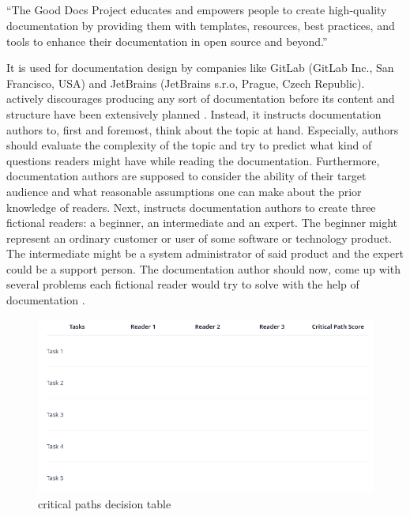 \subsection{\good}\label{s:b-gooddocs}
\begin{displayquote}
	``The Good Docs Project educates and empowers people to create high-quality documentation by providing them with templates, resources, best practices, and tools to enhance their documentation in open source and beyond.''
\end{displayquote}
It is used for documentation design by companies like GitLab (GitLab Inc., San Francisco, USA) and JetBrains (JetBrains s.r.o, Prague, Czech Republic).
\good\space actively discourages producing any sort of documentation before its content and structure have been extensively planned \cite{shorterGoodDocsProject2024}.
Instead, it instructs documentation authors to, first and foremost, think about the topic at hand.
Especially, authors should evaluate the complexity of the topic and try to predict what kind of questions readers might have while reading the documentation.
Furthermore, documentation authors are supposed to consider the ability of their target audience and what reasonable assumptions one can make about the prior knowledge of
readers.
Next, \good\space instructs documentation authors to create three fictional readers: a beginner, an intermediate and an expert.
The beginner might represent an ordinary customer or user of some software or technology product.
The intermediate might be a system administrator of said product
and the expert could be a support person.
The documentation author should now, come up with several problems each fictional reader would try to solve with the help of documentation \cite{shorterGoodDocsProject2024}.
\begin{figure}[h]
	\centerline{
		\includegraphics[scale=0.5]{images/gd_dt.png}}
	\caption{\good\space critical paths decision table \cite{shorterGoodDocsProject2024}}\label{fig:dg-dt}
\end{figure}

